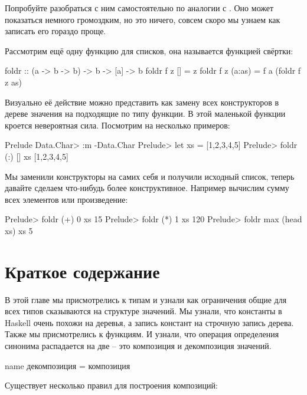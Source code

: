 Попробуйте разобраться с ним самостоятельно по аналогии
с . Оно может показаться немного громоздким,
но это ничего, совсем скоро мы узнаем как записать
его гораздо проще. 

Рассмотрим ещё одну функцию для списков, она называется функцией свёртки:

\begin{code}
foldr :: (a -> b -> b) -> b -> [a] -> b
foldr f z []     = z
foldr f z (a:as) = f a (foldr f z as)
\end{code}

Визуально её действие можно представить как замену 
всех конструкторов в дереве значения на подходящие
по типу функции. В этой маленькой функции кроется 
невероятная сила. Посмотрим на несколько примеров:

\begin{code}
Prelude Data.Char> :m -Data.Char
Prelude> let xs = [1,2,3,4,5]
Prelude> foldr (:) [] xs
[1,2,3,4,5]
\end{code}

Мы заменили конструкторы на самих себя и получили 
исходный список, теперь давайте сделаем что-нибудь
более конструктивное. Например вычислим сумму
всех элементов или произведение:

\begin{code}
Prelude> foldr (+) 0 xs
15
Prelude> foldr (*) 1 xs
120
Prelude> foldr max (head xs) xs
5
\end{code}

\section{Краткое содержание}

В этой главе мы присмотрелись к типам и узнали
как ограничения общие для всех типов сказываются на 
структуре значений. Мы узнали, что константы в Haskell 
очень похожи на деревья, а запись 
констант на строчную запись дерева. Также мы присмотрелись
к функциям. И узнали, что операция определения синонима 
распадается на две -- это композиция и декомпозиция значений.

\begin{code}
name   декомпозиция   =   композиция
\end{code}


Существует несколько правил для построения композиций:

